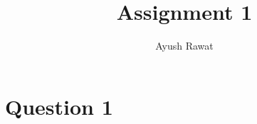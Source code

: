 \documentclass[12pt]{article}
\begin{document}
\title{Assignment 1}
\author{Ayush Rawat}
\maketitle
\section{Question 1}
\end{document}
